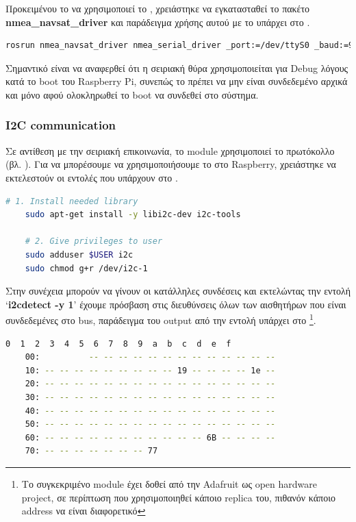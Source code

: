 Προκειμένου το  να χρησιμοποιεί το , χρειάστηκε να εγκατασταθεί το πακέτο \textbf{nmea\_navsat\_driver} \cite{nmea-navsat-driver} και παράδειγμα χρήσης αυτού με το  υπάρχει στο .  

\begin{lstlisting}[language=bash, escapechar=@, caption={GPS - ROS sample usage},label=list:gps-ros-sample-usage]
    rosrun nmea_navsat_driver nmea_serial_driver _port:=/dev/ttyS0 _baud:=9600 
\end{lstlisting}

Σημαντικό είναι να αναφερθεί ότι η σειριακή θύρα χρησιμοποιείται για Debug λόγους κατά το boot
του Raspberry Pi, συνεπώς το  πρέπει να μην είναι συνδεδεμένο αρχικά και μόνο αφού ολοκληρωθεί το boot να συνδεθεί στο σύστημα.

\subsubsection{I2C communication}
Σε αντίθεση με την σειριακή επικοινωνία, το  module χρησιμοποιεί το  πρωτόκολλο (βλ. ).
Για να μπορέσουμε να χρησιμοποιήσουμε το  στο Raspberry, χρειάστηκε να εκτελεστούν οι εντολές που υπάρχουν στο .

\begin{lstlisting}[language=bash, escapechar=@, caption={Fix I2C communication},label=list:fix-I2C-communication]
    # 1. Install needed library
    sudo apt-get install -y libi2c-dev i2c-tools 

    # 2. Give privileges to user
    sudo adduser $USER i2c
    sudo chmod g+r /dev/i2c-1
\end{lstlisting}

Στην συνέχεια μπορούν να γίνουν οι κατάλληλες συνδέσεις και εκτελώντας την ε\-ντο\-λή `\textbf{i2cdetect -y 1}' έχουμε πρόσβαση στις διευθύνσεις όλων των αισθητήρων που είναι συνδεδεμένες στο  bus, παράδειγμα του output από την εντολή υπάρχει στο \footnote{Το συγκεκριμένο module έχει δοθεί από την Adafruit ως open hardware project, σε περίπτωση που χρησιμοποιηθεί κάποιο replica του, πιθανόν κάποιο address να είναι διαφορετικό}.

\begin{lstlisting}[language=bash, escapechar=@, caption={I2C addressed output example},label=list:I2C-output]
    0  1  2  3  4  5  6  7  8  9  a  b  c  d  e  f
    00:          -- -- -- -- -- -- -- -- -- -- -- -- -- 
    10: -- -- -- -- -- -- -- -- -- 19 -- -- -- -- 1e -- 
    20: -- -- -- -- -- -- -- -- -- -- -- -- -- -- -- -- 
    30: -- -- -- -- -- -- -- -- -- -- -- -- -- -- -- -- 
    40: -- -- -- -- -- -- -- -- -- -- -- -- -- -- -- -- 
    50: -- -- -- -- -- -- -- -- -- -- -- -- -- -- -- -- 
    60: -- -- -- -- -- -- -- -- -- -- -- 6B -- -- -- -- 
    70: -- -- -- -- -- -- -- 77       
\end{lstlisting}


